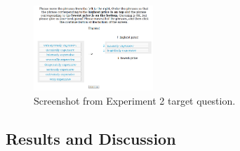 \documentclass[10pt,letterpaper]{article}
\begin{document}
\begin{figure}[htb]
\begin{center}
\includegraphics[width=0.4\textwidth]{analysis_files_for_writeup/images/exp2-q.png}
\end{center}
\caption{Screenshot from Experiment 2 target question.} 
\label{exp2-q}
\end{figure}


\subsection{Results and Discussion}
\end{document}
